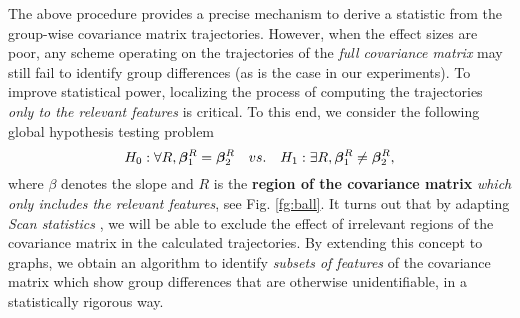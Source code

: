 
The above procedure provides a precise mechanism to derive a statistic from the group-wise covariance matrix trajectories.
However, when the effect sizes are poor, any scheme operating on 
the trajectories of the {\em full covariance matrix} may still fail to identify group differences (as is the case in our experiments). To improve statistical power, localizing the process of computing the trajectories {\em 
  only to the relevant features} is critical. 
%
%
To this end, we consider the following global hypothesis testing problem
\begin{equation*}
H_0: \forall R, \bm{\beta}_1^R=\bm{\beta}_2^R \quad vs. \quad H_1: \exists R, \bm{\beta}_1^R\ne\bm{\beta}_2^R,
\end{equation*}       
where $\beta$ denotes the slope and $R$ is the \textbf{region of the covariance matrix}
{\em which only includes the relevant features}, see Fig. \ref{fg:ball}.
It turns out that by adapting {\em Scan statistics} \citep{fan2012control, arias2011detection}, we will be able to exclude the effect of irrelevant regions of the covariance 
matrix in the calculated trajectories. 
By extending this concept to graphs, we obtain an algorithm to identify {\em subsets of features} of the covariance matrix which show group differences that 
are otherwise unidentifiable, in a statistically rigorous way. 

